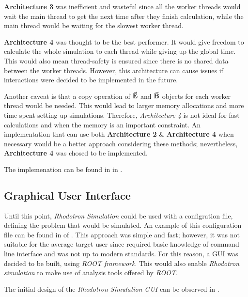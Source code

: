 \documentclass[a4paper,oneside,12pt]{report}
\numberwithin{equation}{chapter}
\begin{document}
\textbf{Architecture 3} was inefficient and wasteful since all the worker threads would wait the main thread to get the next time after they finish calculation, while the main thread would be waiting for the slowest worker thread.

\textbf{Architecture 4} was thought to be the best performer. It would give freedom to calculate the whole simulation to each thread while giving up the global time.
This would also mean thread-safety is ensured since there is no shared data between the worker threads. 
However, this architecture can cause issues if \ee interactions were decided to be implemented in the future.

Another caveat is that a copy operation of $\vec{\textbf{E}}$ and $\vec{\textbf{B}}$ objects for each worker thread would be needed.
This would lead to larger memory allocations and more time spent setting up simulations. 
Therefore, \textit{Architecture 4} is not ideal for fast calculations and when the memory is an important constraint.
An implementation that can use both \textbf{Architecture 2} \& \textbf{Architecture 4} when necessary would be a better approach considering these methods;
nevertheless, \textbf{Architecture 4} was chosed to be implemented.

The implemenation can be found in  in .

\subsection{Graphical User Interface}
Until this point, \textit{Rhodotron Simulation} could be used with a configration file, defining the problem that would be simulated.
An example of this configuration file can be found in  of . 
This approach was simple and fast; however, it was not suitable for the average target user since required basic knowledge of command line interface and was not up to modern standards.
For this reason, a GUI was decided to be built, using \textit{ROOT framework}. 
This would also enable \textit{Rhodotron simulation} to make use of analysis tools offered by \textit{ROOT}.

The initial design of the \textit{Rhodotron Simulation GUI} can be observed in .
\end{document}
